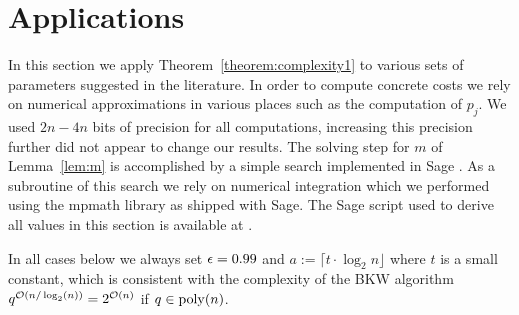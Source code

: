 \section{Applications}
\label{sec:parameters}
In this section we apply Theorem~\ref{theorem:complexity1} to various sets of parameters suggested in the literature. In order to compute concrete costs we rely on numerical approximations in various places such as the computation of $p_j$. We used $2n-4n$ bits of precision for all computations, increasing this precision further did not appear to change our results. The solving step for $m$ of Lemma~\ref{lem:m} is accomplished by a simple search implemented in Sage \cite{sagemath}. As a subroutine of this search we rely on numerical integration which we performed using the mpmath library \cite{mpmath} as shipped with Sage. The Sage script used to derive all values in this section is available at \cite{albrecht:bitbucket2012}.

In all cases below we always set $\epsilon = 0.99$ and $a := \lceil t\cdot \log_2 n\rfloor$ where $t$ is a small constant, which is consistent with the complexity of the BKW algorithm $q^{\mathcal{O}\left(n/\log_2(n)\right)} = 2^{\mathcal{O}\left(n\right)}$ if $q \in {\rm poly}(n)$.

